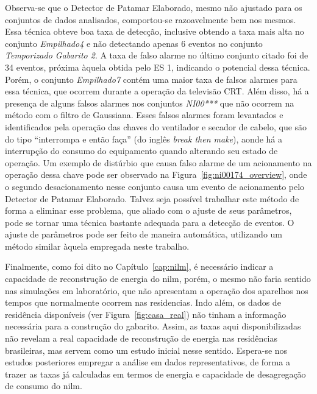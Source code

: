 Observa-se que o Detector de Patamar Elaborado, mesmo não ajustado
para os conjuntos de dados analisados, comportou-se razoavelmente bem
nos mesmos. Essa técnica obteve boa taxa de detecção, inclusive
obtendo a taxa mais alta no conjunto \emph{Empilhado4} e não
detectando apenas 6 eventos no conjunto \emph{Temporizado Gabarito 2}.
A taxa de falso alarme no último conjunto citado foi de 34 eventos,
próxima àquela obtida pelo ES 1, indicando o potencial dessa técnica.
Porém, o conjunto \emph{Empilhado7} contém uma maior taxa de falsos
alarmes para essa técnica, que ocorrem durante a operação da televisão
CRT. Além disso, há a presença de alguns falsos alarmes nos conjuntos
\emph{NI00***} que não ocorrem na método com o filtro de Gaussiana.
Esses falsos alarmes foram levantados e identificados pela operação
das chaves do ventilador e secador de cabelo, que são do tipo
``interrompa e então faça'' (do inglês \emph{break then make}), aonde
há a interrupção do consumo do equipamento quando alterando seu estado
de operação. Um exemplo de distúrbio que causa falso alarme de um
acionamento na operação dessa chave pode ser observado na
Figura~\ref{fig:ni00174_overview}, onde o segundo desacionamento nesse
conjunto causa um evento de acionamento pelo Detector de Patamar
Elaborado. Talvez seja possível trabalhar este método de forma a
eliminar esse problema, que aliado com o ajuste de seus parâmetros,
pode se tornar uma técnica bastante adequada para a detecção de
eventos. O ajuste de parâmetros pode ser feito de maneira automática,
utilizando um método similar àquela empregada neste trabalho.

Finalmente, como foi dito no Capítulo~\ref{cap:nilm}, é necessário
indicar a capacidade de reconstrução de energia do \acs{nilm}, porém, o
mesmo não faria sentido nas simulações em laboratório, que não
apresentam a operação dos aparelhos nos tempos que normalmente ocorrem
nas residencias. Indo além, os dados de residência disponíveis (ver
Figura~\ref{fig:casa_real}) não tinham a informação necessária para a
construção do gabarito. Assim, as taxas aqui disponibilizadas não
revelam a real capacidade de reconstrução de energia nas residências
brasileiras, mas servem como um estudo inicial nesse sentido.
Espera-se nos estudos posteriores empregar a análise em dados
representativos, de forma a trazer as taxas já calculadas em termos de
energia e capacidade de desagregação de consumo do \acs{nilm}.


